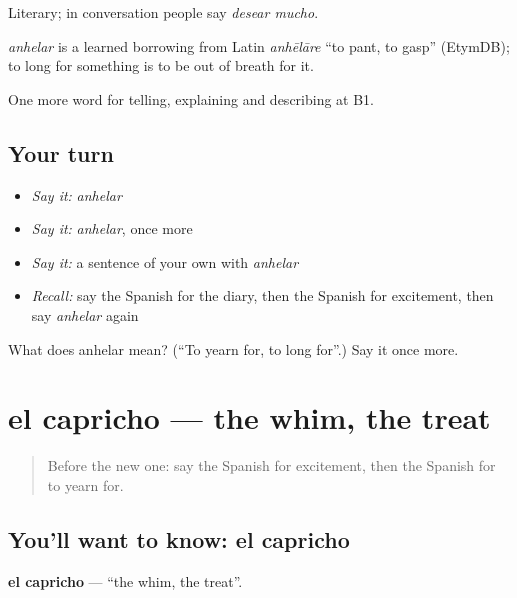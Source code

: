 Literary; in conversation people say \emph{desear mucho}.

\begin{cousinweb}
\emph{anhelar} is a learned borrowing from Latin \emph{anhēlāre} \textquotedblleft{}to pant, to gasp\textquotedblright{} (EtymDB); to long for something is to be out of breath for it.
\end{cousinweb}

\begin{grammarlens}[title={What you've built}]
One more word for telling, explaining and describing at B1.
\end{grammarlens}

\subsection*{Your turn}
\begin{itemize}
\raggedright
  \item \emph{Say it:} \emph{anhelar}
  \item \emph{Say it:} \emph{anhelar}, once more
  \item \emph{Say it:} a sentence of your own with \emph{anhelar}
  \item \emph{Recall:} say the Spanish for the diary, then the Spanish for excitement, then say \emph{anhelar} again
\end{itemize}

\begin{tcolorbox}[breakable,colback=teal!4,colframe=teal!35!black,title={Before you move on}]
What does anhelar mean? (\textquotedblleft{}To yearn for, to long for\textquotedblright{}.) Say it once more.
\end{tcolorbox}
\section[el capricho]{el capricho — the whim, the treat}

\label{lesson:ES-C765-capricho}



\begin{quote}
Before the new one: say the Spanish for excitement, then the Spanish for to yearn for.
\end{quote}

\subsection*{You'll want to know: el capricho}
\textbf{el capricho} — \textquotedblleft{}the whim, the treat\textquotedblright{}.

